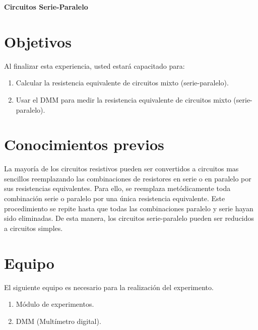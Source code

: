 \thispagestyle{fancy}
\begin{center}
	\LARGE{\textbf{Circuitos Serie-Paralelo}}
\end{center}
\section{Objetivos}
Al finalizar esta experiencia, usted estará capacitado para:
\begin{enumerate}
	\item Calcular la resistencia equivalente de circuitos mixto (serie-paralelo).
	\item Usar el DMM para medir la resistencia equivalente  de circuitos mixto (serie-paralelo). 
\end{enumerate}
\section{Conocimientos previos}
La mayoría de los circuitos resistivos pueden ser convertidos a circuitos mas sencillos reemplazando las combinaciones de resistores en serie o en paralelo por sus resistencias equivalentes.
Para ello, se reemplaza metódicamente toda combinación serie o paralelo  por una única resistencia equivalente. Este procedimiento se repite hasta que todas las combinaciones paralelo y serie  hayan sido eliminadas. De esta manera, los circuitos  serie-paralelo pueden ser reducidos a circuitos simples. 
\section{Equipo}
El siguiente equipo es necesario para la realización del experimento.
\begin{enumerate}
	\item Módulo de experimentos.
	\item DMM (Multímetro digital).
\end{enumerate}
